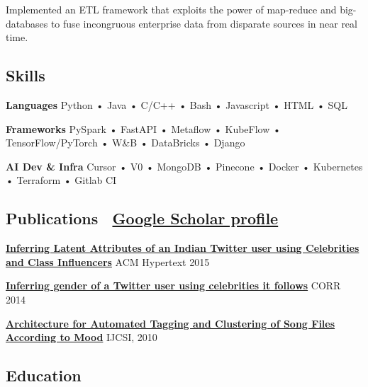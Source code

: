 \documentclass[11pt,letterpaper]{article}
\newcommand{\normalsizesection}{\normalsize}
\newcommand{\smallersection}{\small}
\newcommand{\tinyfootnote}{\fontsize{8pt}{9pt}\selectfont} %
\newcommand{\sectionbox}[1]{%
    \vspace{0.2em}
    \begin{tcolorbox}[
        colback=sectionbg,
        colframe=sectionbg,
        width=\textwidth,
        left=5pt,
        right=5pt,
        top=2pt,
        bottom=2pt,
        boxrule=0pt,
        arc=0pt,
        boxsep=0pt,
    ]
    \section*{#1}
    \end{tcolorbox}
    \vspace{-0.3em}
}
\newenvironment{projectdesc}{%
    \leftskip=1.0cm
    \footnotesize
    \par\noindent
}{\par\leftskip=0cm\smallersection\vspace{-3pt}}
\newcommand{\iconlink}[3]{%
    #1~\href{#2}{#3}%
}
\begin{document}
\begin{projectdesc}
    Implemented an ETL framework that exploits the power of map-reduce and big-databases to fuse incongruous enterprise data from disparate sources in near real time.
\end{projectdesc}

\normalsizesection

\vspace{30pt} %

\sectionbox{Skills}
\smallersection

\noindent\textbf{Languages} \hspace{2mm} Python • Java • C/C++ • Bash • Javascript • HTML • SQL

\vspace{1pt}
\noindent\textbf{Frameworks} \hspace{0.5mm} PySpark • FastAPI • Metaflow • KubeFlow • TensorFlow/PyTorch • W\&B • DataBricks  • Django

\vspace{1pt}
\noindent\textbf{AI Dev \& Infra} \hspace{1mm} Cursor • V0 • MongoDB • Pinecone • Docker • Kubernetes • Terraform • Gitlab CI

\normalsizesection

\sectionbox{Publications \hfill \normalsize\iconlink{\faGraduationCap}{https://scholar.google.com/citations?user=NrYKcaMAAAAJ\&hl=en}{Google Scholar profile}}
\tinyfootnote %

\noindent\textbf{\href{http://dl.acm.org/citation.cfm?id=2806657}{Inferring Latent Attributes of an Indian Twitter user using Celebrities and Class Influencers}} \hfill \href{https://www.youtube.com/watch?v=9BtWs3Rn2Ng}{\faYoutube} ACM Hypertext 2015

\vspace{-1pt}
\noindent\textbf{\href{http://arxiv.org/abs/1405.6667}{Inferring gender of a Twitter user using celebrities it follows}} \hfill CORR 2014

\vspace{-1pt}
\noindent\textbf{\href{http://arxiv.org/abs/1206.2484}{Architecture for Automated Tagging and Clustering of Song Files According to Mood}} \hfill IJCSI, 2010

\normalsizesection

\sectionbox{Education}
\smallersection
\end{document}
